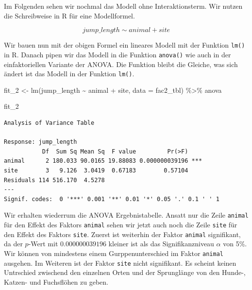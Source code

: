 \documentclass[
  letterpaper,
]{scrbook}
\newenvironment{Shaded}{\begin{snugshade}}{\end{snugshade}}
\newcommand{\AttributeTok}[1]{\textcolor[rgb]{0.40,0.45,0.13}{#1}}
\newcommand{\FunctionTok}[1]{\textcolor[rgb]{0.28,0.35,0.67}{#1}}
\newcommand{\NormalTok}[1]{\textcolor[rgb]{0.00,0.23,0.31}{#1}}
\newcommand{\OtherTok}[1]{\textcolor[rgb]{0.00,0.23,0.31}{#1}}
\newcommand{\SpecialCharTok}[1]{\textcolor[rgb]{0.37,0.37,0.37}{#1}}
\begin{document}
{}

Im Folgenden sehen wir nochmal das Modell ohne Interaktionsterm. Wir
nutzen die Schreibweise in R für eine Modellformel.

\[
jump\_length \sim animal + site
\]

Wir bauen nun mit der obigen Formel ein lineares Modell mit der Funktion
\texttt{lm()} in R. Danach pipen wir das Modell in die Funktion
\texttt{anova()} wie auch in der einfaktoriellen Variante der ANOVA. Die
Funktion bleibt die Gleiche, was sich ändert ist das Modell in der
Funktion \texttt{lm()}.

\begin{Shaded}
\begin{Highlighting}[]
\NormalTok{fit\_2 }\OtherTok{\textless{}{-}}  \FunctionTok{lm}\NormalTok{(jump\_length }\SpecialCharTok{\textasciitilde{}}\NormalTok{ animal }\SpecialCharTok{+}\NormalTok{ site, }\AttributeTok{data =}\NormalTok{ fac2\_tbl) }\SpecialCharTok{\%\textgreater{}\%} 
\NormalTok{  anova}

\NormalTok{fit\_2}
\end{Highlighting}
\end{Shaded}

\begin{verbatim}
Analysis of Variance Table

Response: jump_length
           Df  Sum Sq Mean Sq  F value         Pr(>F)    
animal      2 180.033 90.0165 19.88083 0.000000039196 ***
site        3   9.126  3.0419  0.67183        0.57104    
Residuals 114 516.170  4.5278                            
---
Signif. codes:  0 '***' 0.001 '**' 0.01 '*' 0.05 '.' 0.1 ' ' 1
\end{verbatim}

Wir erhalten wiederrum die ANOVA Ergebnistabelle. Ansatt nur die Zeile
\texttt{animal} für den Effekt des Faktors \texttt{animal} sehen wir
jetzt auch noch die Zeile \texttt{site} für den Effekt des Faktors
\texttt{site}. Zuerst ist weiterhin der Faktor \texttt{animal}
signifikant, da der \(p\)-Wert mit \(0.000000039196\) kleiner ist als
das Signifikanzniveau \(\alpha\) von 5\%. Wir können von mindestens
einem Gurppenunterschied im Faktor \texttt{animal} ausgehen. Im Weiteren
ist der Faktor \texttt{site} nicht signifikant. Es scheint keinen
Untrschied zwischend den einzelnen Orten und der Sprunglänge von den
Hunde-, Katzen- und Fuchsflöhen zu geben.
\end{document}
